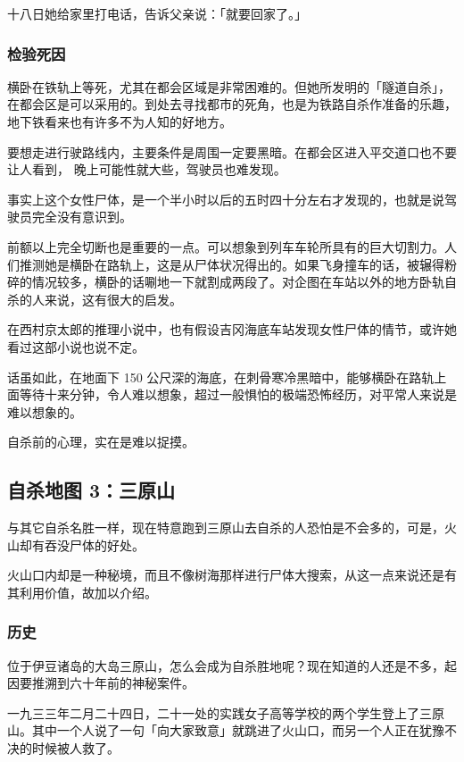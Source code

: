 \documentclass[UTF8]{ctexart}
\begin{document}
十八日她给家里打电话，告诉父亲说：「就要回家了。」

\subsubsection*{检验死因}

横卧在铁轨上等死，尤其在都会区域是非常困难的。但她所发明的「隧道自杀」，在都会区是可以采用的。到处去寻找都市的死角，也是为铁路自杀作准备的乐趣，地下铁看来也有许多不为人知的好地方。

要想走进行驶路线内，主要条件是周围一定要黑暗。在都会区进入平交道口也不要让人看到， 晚上可能性就大些，驾驶员也难发现。

事实上这个女性尸体，是一个半小时以后的五时四十分左右才发现的，也就是说驾驶员完全没有意识到。 

前额以上完全切断也是重要的一点。可以想象到列车车轮所具有的巨大切割力。人们推测她是横卧在路轨上，这是从尸体状况得出的。如果飞身撞车的话，被辗得粉碎的情况较多，横卧的话唰地一下就割成两段了。对企图在车站以外的地方卧轨自杀的人来说，这有很大的启发。

在西村京太郎的推理小说中，也有假设吉冈海底车站发现女性尸体的情节，或许她看过这部小说也说不定。

话虽如此，在地面下 150 公尺深的海底，在刺骨寒冷黑暗中，能够横卧在路轨上面等待十来分钟，令人难以想象，超过一般惧怕的极端恐怖经历，对平常人来说是难以想象的。

自杀前的心理，实在是难以捉摸。

\subsection{自杀地图 3：三原山}

与其它自杀名胜一样，现在特意跑到三原山去自杀的人恐怕是不会多的，可是，火山却有吞没尸体的好处。

火山口内却是一种秘境，而且不像树海那样进行尸体大搜索，从这一点来说还是有其利用价值，故加以介绍。

\subsubsection*{历史}

位于伊豆诸岛的大岛三原山，怎么会成为自杀胜地呢？现在知道的人还是不多，起因要推溯到六十年前的神秘案件。

一九三三年二月二十四日，二十一处的实践女子高等学校的两个学生登上了三原山。其中一个人说了一句「向大家致意」就跳进了火山口，而另一个人正在犹豫不决的时候被人救了。
\end{document}
